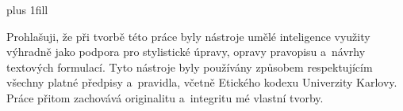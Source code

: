 \vglue 0pt plus 1fill

Prohlašuji, že při tvorbě této práce byly nástroje umělé inteligence využity výhradně jako podpora pro stylistické úpravy, opravy pravopisu a~návrhy textových formulací. Tyto nástroje byly používány způsobem respektujícím všechny platné předpisy a~pravidla, včetně Etického kodexu Univerzity Karlovy. Práce přitom zachovává originalitu a~integritu mé vlastní tvorby.

\vspace{20mm}
\newpage